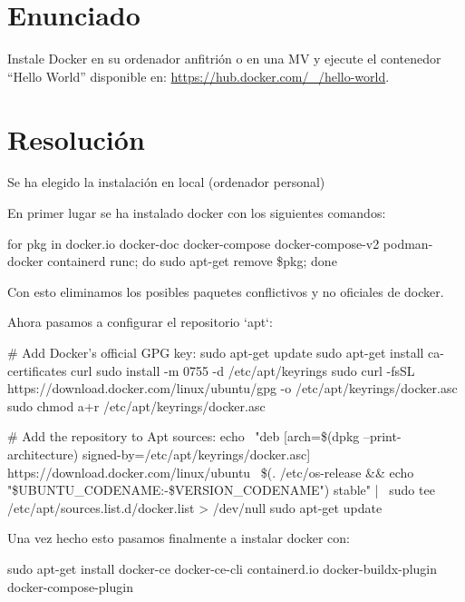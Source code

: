 \documentclass[12pt]{article}
\begin{document}
\sffamily
    \portada[%
        titulo=Ingeniería de Servidores (Prácticas),
        subtitulo=Ejercicio Evaluable docker compose,
        autor=Jesús Muñoz Velasco,
        año=Curso 2024-2025]
        
    \thispagestyle{empty}
    \tableofcontents
    \newpage

    \section{Enunciado}
Instale Docker en su ordenador anfitrión o en una MV y ejecute el contenedor “Hello World” disponible en: \url{https://hub.docker.com/_/hello-world}.

\section{Resolución}

Se ha elegido la instalación en local (ordenador personal)

En primer lugar se ha instalado docker con los siguientes comandos:
\begin{icodeblock}[bash]
for pkg in docker.io docker-doc docker-compose docker-compose-v2 podman-docker containerd runc; do sudo apt-get remove \$pkg; done
\end{icodeblock}
Con esto eliminamos los posibles paquetes conflictivos y no oficiales de docker.

Ahora pasamos a configurar el repositorio `apt`:
\begin{icodeblock}[bash]
# Add Docker's official GPG key:
sudo apt-get update
sudo apt-get install ca-certificates curl
sudo install -m 0755 -d /etc/apt/keyrings
sudo curl -fsSL https://download.docker.com/linux/ubuntu/gpg -o /etc/apt/keyrings/docker.asc
sudo chmod a+r /etc/apt/keyrings/docker.asc

# Add the repository to Apt sources:
echo \
  "deb [arch=\$(dpkg --print-architecture) signed-by=/etc/apt/keyrings/docker.asc] https://download.docker.com/linux/ubuntu \
  \$(. /etc/os-release && echo "\${UBUNTU_CODENAME:-\$VERSION_CODENAME}") stable" | \
  sudo tee /etc/apt/sources.list.d/docker.list > /dev/null
sudo apt-get update
\end{icodeblock}

Una vez hecho esto pasamos finalmente a instalar docker con:
\begin{icodeblock}[bash]
sudo apt-get install docker-ce docker-ce-cli containerd.io docker-buildx-plugin docker-compose-plugin
\end{icodeblock}
\end{document}
